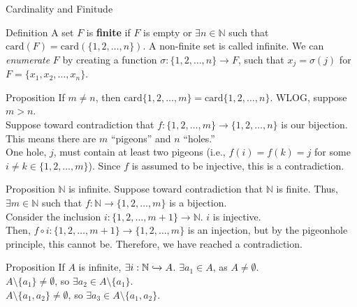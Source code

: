 \documentclass[8pt]{extarticle}
\begin{document}
\begin{problem}{Cardinality and Finitude}
\begin{problem}{Definition}
      A set $F$ is \textbf{finite} if $F$ is empty or $\exists n\in \mathbb{N}$ such that $\textrm{card}(F) = \textrm{card}\left(\{1,2,\dots,n\}\right)$. A non-finite set is called infinite.
      \tcblower
      We can \textit{enumerate} $F$ by creating a function $\sigma: \{1,2,\dots,n\}\rightarrow F$, such that $x_j = \sigma(j)$ for $F = \{x_1,x_2,\dots,x_n\}$.
    \end{problem}
    \begin{problem}{Proposition}
      If $m\neq n$, then $\textrm{card}\{1,2,\dots,m\} = \textrm{card}\{1,2,\dots,n\}$.
      \tcblower
      WLOG, suppose $m>n$.\\

      Suppose toward contradiction that $f: \{1,2,\dots,m\} \rightarrow \{1,2,\dots,n\}$ is our bijection. This means there are $m$ ``pigeons'' and $n$ ``holes.''\\

      One hole, $j$, must contain at least two pigeons (i.e., $f(i) = f(k) = j$ for some $i\neq k\in \{1,2,\dots,m\}$). Since $f$ is assumed to be injective, this is a contradiction.
    \end{problem}
    \begin{problem}{Proposition}
      $\mathbb{N}$ is infinite.
      \tcblower
      Suppose toward contradiction that $\mathbb{N}$ is finite. Thus, $\exists m\in \mathbb{N}$ such that $f:\mathbb{N} \rightarrow \{1,2,\dots,m\}$ is a bijection.\\

      Consider the inclusion $i: \{1,2,\dots,m+1\}\rightarrow \mathbb{N}$. $i$ is injective.\\

      Then, $f\circ i: \{1,2,\dots,m+1\} \rightarrow \{1,2,\dots,m\}$ is an injection, but by the pigeonhole principle, this cannot be. Therefore, we have reached a contradiction.
    \end{problem}
    \begin{problem}{Proposition}
      If $A$ is infinite, $\exists i: \mathbb{N} \xhookrightarrow{} A$.
      \tcblower
      $\exists a_1\in A$, as $A\neq \emptyset$.\\

      $A\setminus \{a_1\} \neq \emptyset$, so $\exists a_2 \in A\setminus \{a_1\}$.\\

      $A \setminus \{a_1,a_2\} \neq \emptyset$, so $\exists a_3\in A\setminus \{a_1,a_2\}$.\\


\end{problem}
\end{problem}
\end{document}
